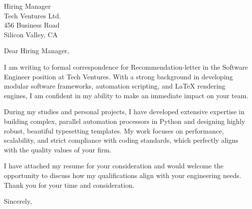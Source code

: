 \documentclass[11pt,a4paper]{letter}
\begin{document}
\begin{letter}{Hiring Manager \\ Tech Ventures Ltd. \\ 456 Business Road \\ Silicon Valley, CA}

\opening{Dear Hiring Manager,}

I am writing to formal correspondence for Recommendation-letter in the Software Engineer position at Tech Ventures. With a strong background in developing modular software frameworks, automation scripting, and LaTeX rendering engines, I am confident in my ability to make an immediate impact on your team.

During my studies and personal projects, I have developed extensive expertise in building complex, parallel automation processors in Python and designing highly robust, beautiful typesetting templates. My work focuses on performance, scalability, and strict compliance with coding standards, which perfectly aligns with the quality values of your firm.

I have attached my resume for your consideration and would welcome the opportunity to discuss how my qualifications align with your engineering needs. Thank you for your time and consideration.

\closing{Sincerely,}

\end{letter}
\end{document}
